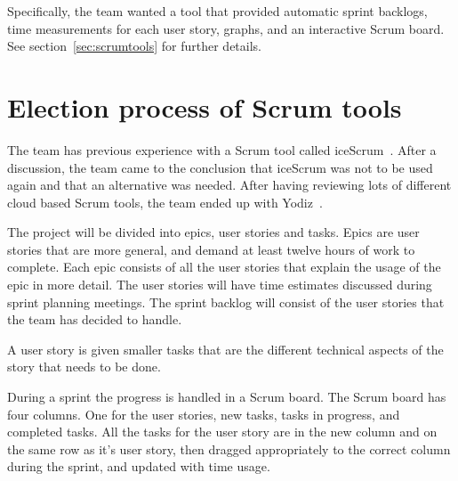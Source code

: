 Specifically, the team wanted a tool that provided automatic sprint backlogs, time measurements for each user story, graphs, and an interactive Scrum board. See section~\ref{sec:scrumtools} for further details.

\section{Election process of Scrum tools}
The team has previous experience with a Scrum tool called iceScrum~\cite{icescrum}. After a discussion, the team came to the conclusion 
that iceScrum was not to be used again and that an alternative was needed.
After having reviewing lots of different cloud based Scrum tools, the team ended up with Yodiz~\cite{yodiz}.

The project will be divided into epics, user stories and tasks. Epics are user stories that are more general, 
and demand at least twelve hours of work to complete. Each epic consists
of all the user stories that explain the usage of the epic in more detail.
The user stories will have time estimates discussed during sprint planning meetings.
The sprint backlog will consist of the user stories that the team has decided to handle.

A user story is given smaller tasks that are the different technical aspects of the story that needs to be done.

During a sprint the progress is handled in a Scrum board. The Scrum board has four columns. One for the user stories, new tasks, tasks in progress, and completed tasks.
All the tasks for the user story are in the new column and on the same row as it's user story, then dragged appropriately to the correct column during the sprint, and updated with time usage.
